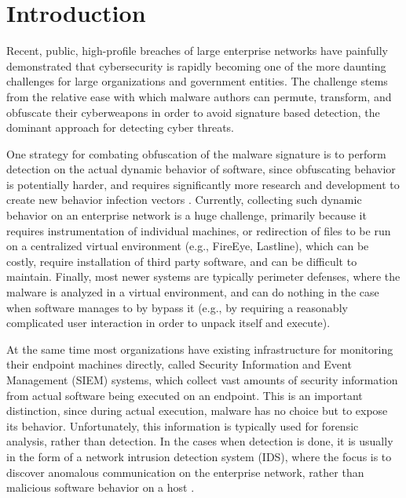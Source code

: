 \documentclass{sig-alternate-2013}
\newcommand{\eg}{e.g.\xspace}
\begin{document}
\section{Introduction}

Recent, public, high-profile breaches of large enterprise networks have painfully demonstrated that cybersecurity is rapidly becoming one of the more daunting  challenges for large organizations and government entities. The challenge stems from the relative ease with which malware authors can permute, transform, and obfuscate their cyberweapons in order to avoid signature based detection, the dominant approach for detecting cyber threats. 

One  strategy for combating obfuscation of the malware signature is to perform detection on the actual dynamic behavior of software, since obfuscating behavior is potentially harder, and requires significantly more research and development to create new behavior infection vectors \cite{moser2007limits}. Currently, collecting such dynamic behavior on an enterprise network is a huge challenge, primarily because it requires instrumentation of individual machines, or redirection of files to be run on a centralized virtual environment (\eg, FireEye, Lastline), which can be costly, require installation of third party software, and can be difficult to maintain. Finally, most newer systems are typically perimeter defenses, where the malware is analyzed in a virtual environment, and can do nothing in the case when software manages to by bypass it (\eg, by requiring a reasonably complicated user interaction in order to unpack itself and execute).

At the same time most organizations have existing infrastructure for monitoring their endpoint machines directly, called Security Information and Event Management (SIEM) systems, which collect vast amounts of security information from actual software being executed on an endpoint. This is an important distinction, since during actual execution, malware has no choice but to expose its behavior. Unfortunately, this information is typically used for forensic analysis, rather than detection. In the cases when detection is done, it is usually in the form of a network intrusion detection system (IDS), where the focus is to discover anomalous communication on the enterprise network, rather than malicious software behavior on a host \cite{yen2013beehive}. 
\end{document}
